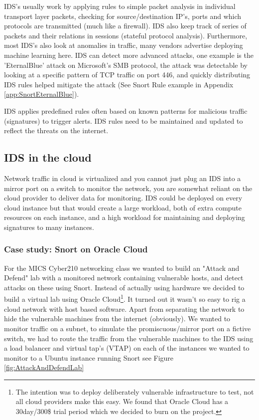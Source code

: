 \documentclass[
	letterpaper, %
	10pt, %
	unnumberedsections, %
	twoside, %
]{APAAssignment}
\begin{document}
IDS's usually work by applying rules to simple packet analysis in individual transport layer packets, checking for source/destination IP's, ports and which protocols are transmitted (much like a firewall). IDS also keep track of series of packets and their relations in sessions (stateful protocol analysis). Furthermore, most IDS's also look at anomalies in traffic, many vendors advertise deploying machine learning here. IDS can detect more advanced attacks, one example is the 'EternalBlue' attack on Microsoft's SMB protocol, the attack was detectable by looking at a specific pattern of TCP traffic on port 446, and quickly distributing IDS rules helped mitigate the attack (See Snort Rule example in Appendix \ref{app:SnortEternalBlue}). 

IDS applies predefined rules often based on known patterns for malicious traffic (signatures) to trigger alerts. IDS rules need to be maintained and updated to reflect the threats on the internet.    

\subsection{IDS in the cloud}
Network traffic in cloud is virtualized and you cannot just plug an IDS into a mirror port on a switch to monitor the network, you are somewhat reliant on the cloud provider to deliver data for monitoring. IDS could be deployed on every cloud instance but that would create a large workload, both of extra compute resources on each instance, and a high workload for maintaining and deploying signatures to many instances.       

\subsubsection{Case study: Snort on Oracle Cloud}
For the MICS Cyber210 networking class we wanted to build an "Attack and Defend" lab with a monitored network containing vulnerable hosts, and detect attacks on these using Snort\cite{SNORT}. Instead of actually using hardware we decided to build a virtual lab using Oracle Cloud\footnote{The intention was to deploy deliberately
vulnerable infrastructure to test, not all cloud providers make this easy. We found that Oracle Cloud has a 30day/300\$ trial period which we decided to burn on the project.}. It turned out it wasn't so easy to rig a cloud network with host based software. Apart from separating the network to hide the vulnerable machines from the internet (obviously). We wanted to monitor traffic on a subnet, to simulate the promiscuous/mirror port on a fictive switch, we had to route the traffic from the vulnerable machines to the IDS using a load balancer and virtual tap's (VTAP) on each of the instances we wanted to monitor to a Ubuntu instance running Snort see Figure \ref{fig:AttackAndDefendLab} 
\end{document}
